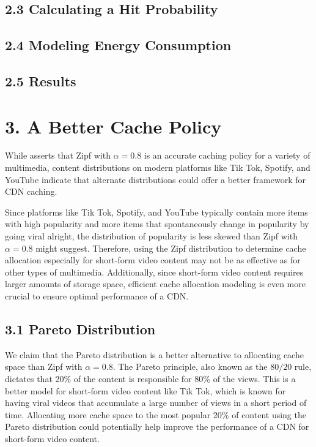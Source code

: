 \documentclass[
	a4paper, %
	10pt, %
	unnumberedsections, %
	twoside, %
]{LTJournalArticle}
\begin{document}
\subsection{2.3  Calculating a Hit Probability}

\subsection{2.4  Modeling Energy Consumption}

\subsection{2.5  Results}


\section{3. A Better Cache Policy}

While \cite{biancoCDNs2017} asserts that Zipf with $\alpha = 0.8$ is an accurate caching policy for a variety of multimedia, content distributions on modern platforms like Tik Tok, Spotify, and YouTube indicate that alternate distributions could offer a better framework for CDN caching. 

Since platforms like Tik Tok, Spotify, and YouTube typically contain more items with high popularity and more items that spontaneously change in popularity by going viral alright, the distribution of popularity is less skewed than Zipf with $\alpha = 0.8$ might suggest. Therefore, using the Zipf distribution to determine cache allocation especially for short-form video content may not be as effective as for other types of multimedia. Additionally, since short-form video content requires larger amounts of storage space, efficient cache allocation modeling is even more crucial to ensure optimal performance of a CDN.


\subsection{3.1 Pareto Distribution}

We claim that the Pareto distribution is a better alternative to allocating cache space than Zipf with $\alpha = 0.8$. The Pareto principle, also known as the $80/20$ rule, dictates that 20\% of the content is responsible for 80\% of the views. This is  a better model for short-form video content like Tik Tok, which is known for having viral videos that accumulate a large number of views in a short period of time. Allocating more cache space to the most popular 20\% of content using the Pareto distribution could potentially help improve the performance of a CDN for short-form video content.
\end{document}

